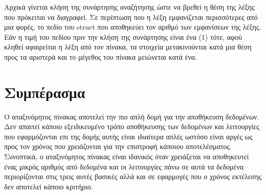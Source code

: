 Αρχικά γίνεται κλήση της συνάρτησης αναζήτησης ώστε να βρεθεί η θέση της λέξης που πρόκειται να διαγραφεί. Σε περίπτωση που η λέξη εμφανίζεται περισσότερες από μια φορές, το πεδίο του struct που αποθηκεύει τον αριθμό των εμφανίσεων της λέξης. Εάν η τιμή του πεδίου πριν την κλήση της συνάρτησης είναι ένα (1) τότε, αφού κληθεί αφαιρείται η λέξη από τον πίνακα, τα στοιχεία μετακινούνται κατά μια θέση προς τα αριστερά και το μέγεθος του πίνακα μειώνεται κατά ένα.

\section{Συμπέρασμα}

Ο αταξινόμητος πίνακας αποτελεί την πιο απλή δομή για την αποθήκευση δεδομένων. Δεν απαιτεί κάποιο εξειδικευμένο τρόπο αποθήκευσης των δεδομένων και λειτουργίες που εφαρμόζονται επι της δομής αυτής είναι ιδιαίτερα απλές ωστόσο είναι αργές ως προς τον χρόνος που χρειάζονται για την επιστροφή κάποιου αποτελέσματος. Συνοπτικά, ο αταξινόμητος πίνακας είναι ιδανικός όταν χρειάζεται να αποθηκευτεί ένας μικρός αριθμός από δεδομένα και οι λειτουργίες πάνω σε αυτά τα δεδομένα περιορίζονται στις τρεις αυτές βασικές αλλά και σε εφαρμογές που ο χρόνος εκτέλεσης δεν αποτελεί κάποιο κριτήριο.
